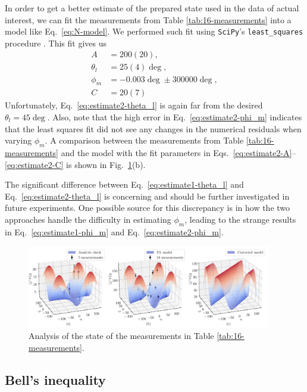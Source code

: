 \documentclass{../paper}
\newcommand{\eq}[1]{Eq.~\eqref{#1}}
\newcommand{\eqs}[2]{Eqs.~\eqref{#1}--\eqref{#2}}
\newcommand{\fig}[1]{Fig.~\ref{#1}}
\begin{document}
In order to get a better estimate of the prepared state used in the data of actual interest, we can fit the measurements from Table \ref{tab:16-measurements} into a model like \eq{eq:N-model}. We performed such fit using {\tt SciPy}'s {\tt least\_squares} procedure \cite{SciPy}. This fit gives us
\begin{align}
  A &= 200(20), \label{eq:estimate2-A} \\
  \theta_l &= 25(4)\deg, \label{eq:estimate2-theta_l} \\
  \phi_m &= -0.003\deg \pm 300000\deg, \label{eq:estimate2-phi_m} \\
  C &= 20(7) \label{eq:estimate2-C}
\end{align}
Unfortunately, \eq{eq:estimate2-theta_l} is again far from the desired $\theta_l = 45\deg$. Also, note that the high error in \eq{eq:estimate2-phi_m} indicates that the least squares fit did not see any changes in the numerical residuals when varying $\phi_m$. A comparison between the measurements from Table \ref{tab:16-measurements} and the model with the fit parameters in \eqs{eq:estimate2-A}{eq:estimate2-C} is shown in \fig{fig:state}(b).

The significant difference between \eq{eq:estimate1-theta_l} and \eq{eq:estimate2-theta_l} is concerning and should be further investigated in future experiments. One possible source for this discrepancy is in how the two approaches handle the difficulty in estimating $\phi_m$, leading to the strange results in \eq{eq:estimate1-phi_m} and \eq{eq:estimate2-phi_m}.

\begin{figure}
  \centering
  \includegraphics[width=0.95\textwidth]{analysis/state.pdf}
  \caption{Analysis of the state of the measurements in Table \ref{tab:16-measurements}.}
  \label{fig:state}
\end{figure}

\subsection{Bell's inequality}
\end{document}
